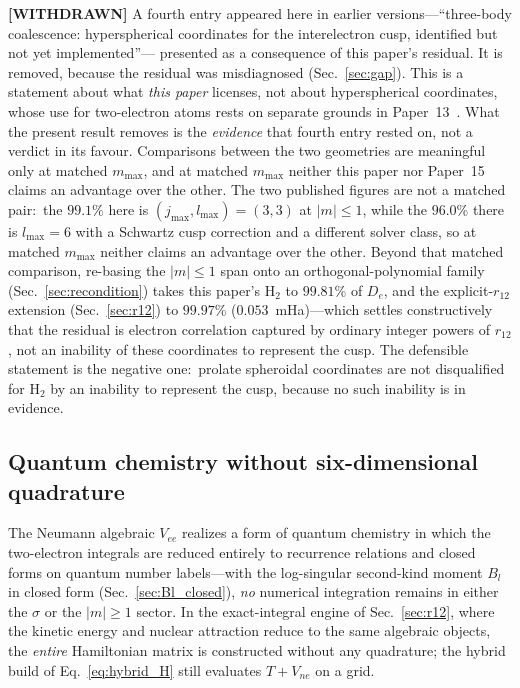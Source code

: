 \documentclass[aps,pra,twocolumn,superscriptaddress,longbibliography]{revtex4-2}
\begin{document}
\textbf{[WITHDRAWN]} A fourth entry appeared here in earlier
versions---``three-body coalescence: hyperspherical coordinates for
the interelectron cusp, identified but not yet implemented''---
presented as a consequence of this paper's residual.  It is removed,
because the residual was misdiagnosed (Sec.~\ref{sec:gap}).  This
is a statement about what \emph{this paper} licenses, not about
hyperspherical coordinates, whose use for two-electron atoms rests
on separate grounds in Paper~13~\cite{loutey_paper13}.  What the
present result removes is the \emph{evidence} that fourth entry
rested on, not a verdict in its favour.  Comparisons between the two
geometries are meaningful only at matched $m_{\max}$, and at matched
$m_{\max}$ neither this paper nor Paper~15~\cite{loutey_paper15}
claims an advantage over the other.  The two published figures are
not a matched pair:\ the $99.1\%$ here is
$(j_{\max},l_{\max}) = (3,3)$ at $|m| \le 1$, while the $96.0\%$
there is $l_{\max} = 6$ with a Schwartz cusp correction and a
different solver class, so at matched $m_{\max}$ neither claims an
advantage over the other.  Beyond that matched comparison, re-basing the
$|m|\le1$ span onto an orthogonal-polynomial family
(Sec.~\ref{sec:recondition}) takes this paper's H$_2$ to $99.81\%$ of
$D_e$, and the explicit-$r_{12}$ extension (Sec.~\ref{sec:r12}) to
$99.97\%$ ($0.053$~mHa)---which settles constructively that the residual
is electron correlation captured by ordinary integer powers of
$r_{12}$, not an inability of these coordinates to represent the cusp.  The defensible statement is the negative one:\
prolate spheroidal coordinates are not disqualified for H$_2$ by an
inability to represent the cusp, because no such inability is in
evidence.

\subsection{Quantum chemistry without six-dimensional quadrature}

The Neumann algebraic $V_{ee}$ realizes a form of quantum
chemistry in which the two-electron integrals are reduced entirely to
recurrence relations and closed forms on quantum number labels---with
the log-singular second-kind moment $B_l$ in closed form
(Sec.~\ref{sec:Bl_closed}), \emph{no} numerical integration remains in
either the $\sigma$ or the $|m| \ge 1$ sector.  In the exact-integral
engine of Sec.~\ref{sec:r12}, where the kinetic energy and nuclear
attraction reduce to the same algebraic objects, the \emph{entire}
Hamiltonian matrix is constructed without any quadrature; the hybrid
build of Eq.~\eqref{eq:hybrid_H} still evaluates $T + V_{ne}$ on a grid.
\end{document}
